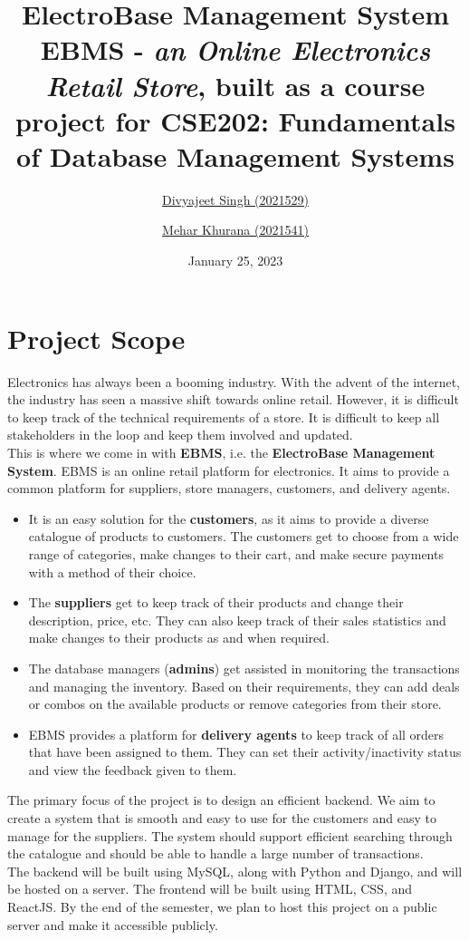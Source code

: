 \documentclass[12pt]{report}
\title{
    \textbf{\Huge ElectroBase Management System} \\
    \vspace*{15pt}
    \large{
        EBMS - \textit{an Online Electronics Retail Store}, built as a course project for
        \normalsize{CSE202: Fundamentals of Database Management Systems}
    }
}
\author{
    \href{mailto:divyajeet21529@iiitd.ac.in}{Divyajeet Singh (2021529)}
    \and
    \href{mailto:mehar21541@iiitd.ac.in}{Mehar Khurana (2021541)}
}
\date{\vspace*{10pt} January 25, 2023}
\begin{document}
    \maketitle

    \section*{\Huge Project Scope}
    \vspace*{10pt}
    Electronics has always been a booming industry.
    With the advent of the internet, the industry has seen a massive shift towards online retail.
    However, it is difficult to keep track of the technical requirements of a store.
    It is difficult to keep all stakeholders in the loop and keep them involved and updated.
    \vspace*{10pt} \\
    This is where we come in with \textbf{EBMS}, i.e. the \textbf{ElectroBase Management System}.
    EBMS is an online retail platform for electronics.
    It aims to provide a common platform for suppliers, store managers, customers, and delivery agents.
    \begin{itemize}
        \item
        It is an easy solution for the \textbf{customers}, as it aims to provide a diverse catalogue of products to customers.
        The customers get to choose from a wide range of categories, make changes to their cart, and make secure payments with a method of their choice.
        \item
        The \textbf{suppliers} get to keep track of their products and change their description, price, etc.
        They can also keep track of their sales statistics and make changes to their products as and when required.
        \item
        The database managers (\textbf{admins}) get assisted in monitoring the transactions and managing the inventory.
        Based on their requirements, they can add deals or combos on the available products or remove categories from their store.
        \item
        EBMS provides a platform for \textbf{delivery agents} to keep track of all orders that have been assigned to them. They can set their activity/inactivity status and view the feedback given to them.
    \end{itemize}
    The primary focus of the project is to design an efficient backend.
    We aim to create a system that is smooth and easy to use for the customers and easy to manage for the suppliers.
    The system should support efficient searching through the catalogue and should be able to handle a large number of transactions.
    \vspace*{10pt} \\
    The backend will be built using MySQL, along with Python and Django, and will be hosted on a server.
    The frontend will be built using HTML, CSS, and ReactJS.
    By the end of the semester, we plan to host this project on a public server and make it accessible publicly.
\end{document}
